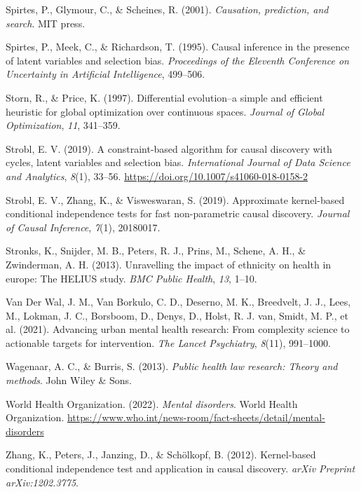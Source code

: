 \documentclass[
]{article}
\newlength{\cslhangindent}
\newenvironment{CSLReferences}[2] %
 {\begin{list}{}{%
  \setlength{\itemindent}{0pt}
  \setlength{\leftmargin}{0pt}
  \setlength{\parsep}{0pt}
  \ifodd #1
   \setlength{\leftmargin}{\cslhangindent}
   \setlength{\itemindent}{-1\cslhangindent}
  \fi
  \setlength{\itemsep}{#2\baselineskip}}}
 {\end{list}}
\begin{document}
\begin{CSLReferences}{1}{0}
Spirtes, P., Glymour, C., \& Scheines, R. (2001). \emph{Causation,
prediction, and search}. MIT press.

Spirtes, P., Meek, C., \& Richardson, T. (1995). Causal inference in the
presence of latent variables and selection bias. \emph{Proceedings of
the {Eleventh} Conference on {Uncertainty} in Artificial Intelligence},
499--506.

Storn, R., \& Price, K. (1997). Differential evolution--a simple and
efficient heuristic for global optimization over continuous spaces.
\emph{Journal of Global Optimization}, \emph{11}, 341--359.

Strobl, E. V. (2019). A constraint-based algorithm for causal discovery
with cycles, latent variables and selection bias. \emph{International
Journal of Data Science and Analytics}, \emph{8}(1), 33--56.
\url{https://doi.org/10.1007/s41060-018-0158-2}

Strobl, E. V., Zhang, K., \& Visweswaran, S. (2019). Approximate
kernel-based conditional independence tests for fast non-parametric
causal discovery. \emph{Journal of Causal Inference}, \emph{7}(1),
20180017.

Stronks, K., Snijder, M. B., Peters, R. J., Prins, M., Schene, A. H., \&
Zwinderman, A. H. (2013). Unravelling the impact of ethnicity on health
in europe: The HELIUS study. \emph{BMC Public Health}, \emph{13}, 1--10.

Van Der Wal, J. M., Van Borkulo, C. D., Deserno, M. K., Breedvelt, J.
J., Lees, M., Lokman, J. C., Borsboom, D., Denys, D., Holst, R. J. van,
Smidt, M. P., et al. (2021). Advancing urban mental health research:
From complexity science to actionable targets for intervention.
\emph{The Lancet Psychiatry}, \emph{8}(11), 991--1000.

Wagenaar, A. C., \& Burris, S. (2013). \emph{Public health law research:
Theory and methods}. John Wiley \& Sons.

World Health Organization. (2022). \emph{Mental disorders}. World Health
Organization.
\url{https://www.who.int/news-room/fact-sheets/detail/mental-disorders}

Zhang, K., Peters, J., Janzing, D., \& Schölkopf, B. (2012).
Kernel-based conditional independence test and application in causal
discovery. \emph{arXiv Preprint arXiv:1202.3775}.

\end{CSLReferences}
\end{document}
